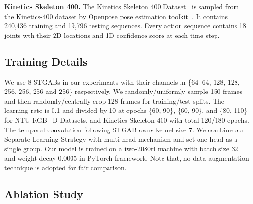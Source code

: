 \documentclass[runningheads]{llncs}
\begin{document}
\textbf{Kinetics Skeleton 400.} The Kinetics Skeleton 400 Dataset~\cite{kay2017kinetics} is sampled from the Kinetics-400 dataset by Openpose pose estimation toolkit~\cite{cao2017realtime}. It contains 240,436 training and 19,796 testing sequences. Every action sequence contains 18 joints wth their 2D locations and 1D confidence score at each time step.
\subsection{Training Details}
\label{sec:Training Details}
We use 8 STGABs in our experiments with their channels in \{64, 64, 128, 128, 256, 256, 256 and 256\} respectively. We randomly/uniformly sample 150 frames and then randomly/centrally crop 128 frames for training/test splits. The learning rate is 0.1 and divided by 10 at epochs \{60, 90\}, \{60, 90\}, and \{80, 110\} for NTU RGB+D Datasets, and Kinetics Skeleton 400 with total 120/180 epochs. The temporal convolution following STGAB owns kernel size 7. We combine our Separate Learning Strategy with multi-head mechanism and set one head as a single group. Our model is trained on a two-2080ti machine with batch size 32 and weight decay 0.0005 in PyTorch framework. Note that, no data augmentation technique is adopted for fair comparison. 

\subsection{Ablation Study}
\end{document}

